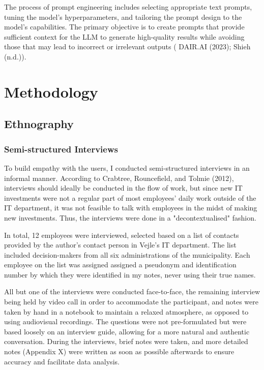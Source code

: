\documentclass[
]{book}
\begin{document}
The process of prompt engineering includes selecting appropriate text prompts, tuning the model's hyperparameters, and tailoring the prompt design to the model's capabilities. The primary objective is to create prompts that provide sufficient context for the LLM to generate high-quality results while avoiding those that may lead to incorrect or irrelevant outputs ( DAIR.AI (2023); Shieh (n.d.)).

\hypertarget{methodology}{%
\section{Methodology}\label{methodology}}

\hypertarget{ethnography}{%
\subsection{Ethnography}\label{ethnography}}

\hypertarget{semi-structured-interviews}{%
\subsubsection{Semi-structured Interviews}\label{semi-structured-interviews}}

To build empathy with the users, I conducted semi-structured interviews in an informal manner. According to Crabtree, Rouncefield, and Tolmie (2012), interviews should ideally be conducted in the flow of work, but since new IT investments were not a regular part of most employees' daily work outside of the IT department, it was not feasible to talk with employees in the midst of making new investments. Thus, the interviews were done in a "decontextualised" fashion.

In total, 12 employees were interviewed, selected based on a list of contacts provided by the author's contact person in Vejle's IT department. The list included decision-makers from all six administrations of the municipality. Each employee on the list was assigned assigned a pseudonym and identification number by which they were identified in my notes, never using their true names.

All but one of the interviews were conducted face-to-face, the remaining interview being held by video call in order to accommodate the participant, and notes were taken by hand in a notebook to maintain a relaxed atmosphere, as opposed to using audiovisual recordings. The questions were not pre-formulated but were based loosely on an interview guide, allowing for a more natural and authentic conversation. During the interviews, brief notes were taken, and more detailed notes (Appendix X) were written as soon as possible afterwards to ensure accuracy and facilitate data analysis.
\end{document}
